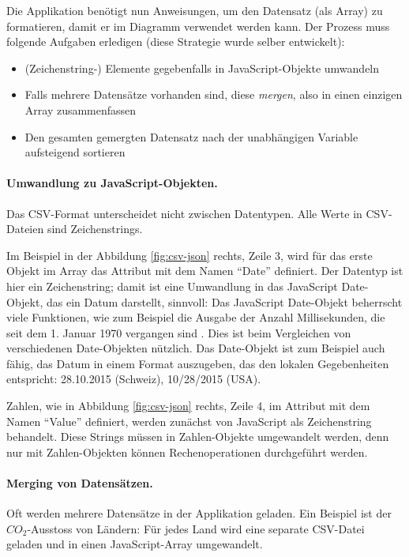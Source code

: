 Die Applikation benötigt nun Anweisungen, um den Datensatz (als Array) zu formatieren, damit er im Diagramm verwendet werden kann. Der Prozess muss folgende Aufgaben erledigen (diese Strategie wurde selber entwickelt):

\begin{itemize}
	\item (Zeichenstring-) Elemente gegebenfalls in JavaScript-Objekte umwandeln
	\item Falls mehrere Datensätze vorhanden sind, diese \textit{mergen}, also in einen einzigen Array zusammenfassen
	\item Den gesamten gemergten Datensatz nach der unabhängigen Variable aufsteigend sortieren
\end{itemize}

\paragraph{Umwandlung zu JavaScript-Objekten.} Das CSV-Format unterscheidet nicht zwischen Datentypen. Alle Werte in CSV-Dateien sind Zeichenstrings.

Im Beispiel in der Abbildung \ref{fig:csv-json} rechts, Zeile 3, wird für das erste Objekt im Array das Attribut mit dem Namen "`Date"' definiert. Der Datentyp ist hier ein Zeichenstring; damit ist eine Umwandlung in das JavaScript Date-Objekt, das ein Datum darstellt, sinnvoll: Das JavaScript Date-Objekt beherrscht viele Funktionen, wie zum Beispiel die Ausgabe der Anzahl Millisekunden, die seit dem 1. Januar 1970 vergangen sind \cite{date-mozilla}. Dies ist beim Vergleichen von verschiedenen Date-Objekten nützlich. Das Date-Objekt ist zum Beispiel auch fähig, das Datum in einem Format auszugeben, das den lokalen Gegebenheiten entspricht: 28.10.2015 (Schweiz), 10/28/2015 (USA).

Zahlen, wie in Abbildung \ref{fig:csv-json} rechts, Zeile 4, im Attribut mit dem Namen "`Value"' definiert, werden zunächst von JavaScript als Zeichenstring behandelt. Diese Strings müssen in Zahlen-Objekte umgewandelt werden, denn nur mit Zahlen-Objekten können Rechenoperationen durchgeführt werden.

\paragraph{Merging von Datensätzen.} Oft werden mehrere Datensätze in der Applikation geladen. Ein Beispiel ist der $CO_2$-Ausstoss von Ländern: Für jedes Land wird eine separate CSV-Datei geladen und in einen JavaScript-Array umgewandelt.

